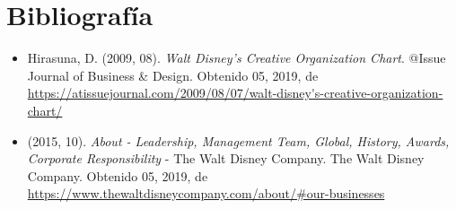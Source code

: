 \section{Bibliografía}

\begin{itemize}

\item
Hirasuna, D. (2009, 08). \textit{Walt Disney’s Creative Organization Chart}. @Issue Journal of Business \& Design. Obtenido 05, 2019, de \url{https://atissuejournal.com/2009/08/07/walt-disney's-creative-organization-chart/}

\item
(2015, 10). \textit{About - Leadership, Management Team, Global, History, Awards, Corporate Responsibility} - The Walt Disney Company. The Walt Disney Company. Obtenido 05, 2019, de \url{https://www.thewaltdisneycompany.com/about/#our-businesses}

\end{itemize}